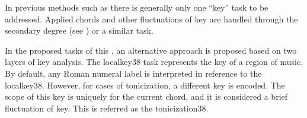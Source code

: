 
In previous methods such as \textcite{chen2018functional,
chen2019harmony, micchi2020not, micchi2021deep,
mcleod2021modular} there is generally only one ``key'' task to be
addressed. Applied chords and other fluctuations of key are
handled through the secondary degree (see
) or a similar task.

In the proposed tasks of this \thesisdiss{}, an alternative
approach is proposed based on two layers of key analysis.
The \gls{localkey38} task represents the key of a region of
music. By default, any Roman numeral label is interpreted in
reference to the \gls{localkey38}. However, for cases of
tonicization, a different key is encoded. The scope of this
key is uniquely for the current chord, and it is considered
a brief fluctuation of key. This is referred as the
\gls{tonicization38}.
